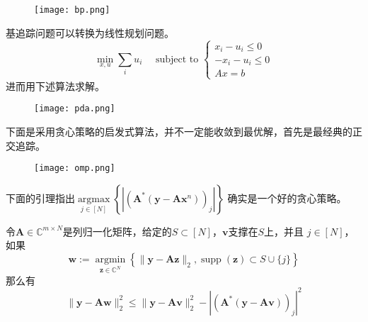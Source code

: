 \begin{figure}[!htbp]
    \centering
    \texttt{[image: bp.png]}
\end{figure}
基追踪问题可以转换为线性规划问题。
\begin{equation}
    \min _{x,u} \sum_i u_i \quad \text { subject to } \begin{cases}
    x_i-u_i  \leq 0 \\
    -x_i-u_i  \leq 0\\
    A x  =b
    \end{cases}
\end{equation}
进而用下述算法求解。\par
\begin{figure}[!htbp]
    \centering
    \texttt{[image: pda.png]}
\end{figure}
下面是采用贪心策略的启发式算法，并不一定能收敛到最优解，首先是最经典的正交追踪。\par
\begin{figure}[!htbp]
    \centering
    \texttt{[image: omp.png]}
\end{figure}
下面的引理指出$\underset{j \in[N]}{\operatorname{argmax}}\left\{\left|\left(\mathbf{A}^*\left(\mathbf{y}-\mathbf{A} \mathbf{x}^n\right)\right)_j\right|\right\}$
确实是一个好的贪心策略。
\begin{lemma}
    令$\mathbf{A} \in \mathbb{C}^{m \times N}$是列归一化矩阵，给定的$S \subset[N]$，$\mathbf{v}$支撑在$S$上，并且
    $j \in[N]$，如果
    \begin{equation}
        \mathbf{w}:=\underset{\mathbf{z} \in \mathbb{C}^N}{\operatorname{argmin}}\left\{\|\mathbf{y}-\mathbf{A z}\|_2,\operatorname{supp}(\mathbf{z}) \subset S \cup\{j\}\right\}
    \end{equation}
    那么有
    \begin{equation}
        \|\mathbf{y}-\mathbf{A} \mathbf{w}\|_2^2 \leq\|\mathbf{y}-\mathbf{A v}\|_2^2-\left|\left(\mathbf{A}^*(\mathbf{y}-\mathbf{A} \mathbf{v})\right)_j\right|^2
    \end{equation}
\end{lemma}
